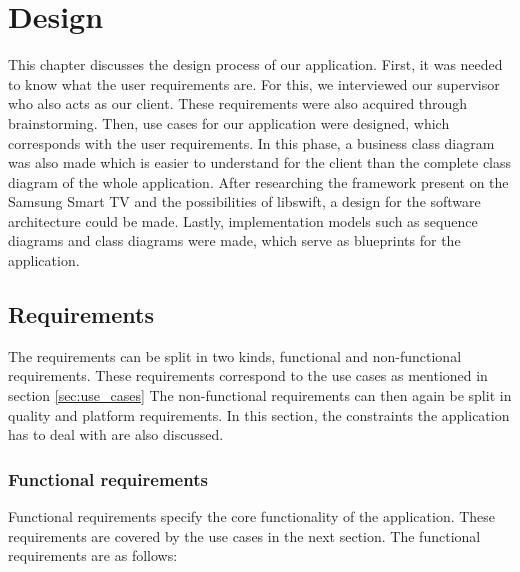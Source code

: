 \chapter{Design}
This chapter discusses the design process of our application. First, it was needed to know what the user requirements are. For this, we interviewed our supervisor who also acts as our client. These requirements were also acquired through brainstorming. Then, use cases for our application were designed, which corresponds with the user requirements. In this phase, a business class diagram was also made which is easier to understand for the client than the complete class diagram of the whole application. After researching the framework present on the Samsung Smart TV and the possibilities of libswift, a design for the software architecture could be made. Lastly, implementation models such as sequence diagrams and class diagrams were made, which serve as blueprints for the application.

\section{Requirements}
The requirements can be split in two kinds, functional and non-functional requirements. These requirements  correspond to the use cases as mentioned in section \hyperref[sec:use_cases]{\ref*{sec:use_cases}} The non-functional requirements can then again be split in quality and platform requirements. In this section, the constraints the application has to deal with are also discussed.

\subsection{Functional requirements} 
Functional requirements specify the core functionality of the application. These requirements are covered by the use cases in the next section. The functional requirements are as follows:


